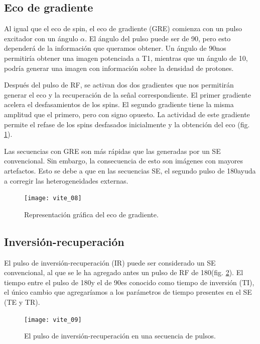 \subsection{Eco de gradiente }
Al igual que el eco de spin, el eco de gradiente (GRE) comienza con un pulso excitador con un ángulo $\alpha$. El ángulo del pulso puede ser de 90\degrees, pero esto dependerá de la información que queramos obtener. Un ángulo de 90\degrees nos permitiría obtener una imagen potenciada a T1, mientras que un ángulo de 10\degrees, podría generar una imagen con información sobre la densidad de protones. 

Después del pulso de RF, se activan dos dos gradientes que nos permitirán generar el eco y la recuperación de la señal correspondiente. El primer gradiente acelera el desfasamientos de los spins. El segundo gradiente tiene la misma amplitud que el primero, pero con signo opuesto. La actividad de este gradiente permite el refase de los spins desfasados inicialmente y la obtención del eco (fig. \ref{fig:seq_GRE}).

Las secuencias con GRE son más rápidas que las generadas por un SE convencional. Sin embargo, la consecuencia de esto son imágenes con mayores artefactos. Esto se debe a que en las secuencias SE, el segundo pulso de 180\degrees ayuda a corregir las heterogeneidades externas. 


\begin{figure}[htb]
\begin{figg}
   \texttt{[image: vite\_08]}
   \caption{Representación gráfica del eco de gradiente.}
 \label{fig:seq_GRE}
 \end{figg}
\end{figure}


\subsection{Inversión-recuperación}
\label{lab:IR}
El pulso de inversión-recuperación (IR) puede ser considerado un SE convencional, al que se le ha agregado antes un pulso de RF de 180\degrees (fig. \ref{fig:seq_IR}). El tiempo entre el pulso de 180\degrees y el de 90\degrees es conocido como tiempo de inversión (TI), el único cambio que agregaríamos a los parámetros de tiempo presentes en el SE (TE y TR). 


\begin{figure}[htb]
\begin{figg}
   \texttt{[image: vite\_09]}
   \caption{El pulso de inversión-recuperación en una secuencia de pulsos. }
 \label{fig:seq_IR}
 \end{figg}
\end{figure}




